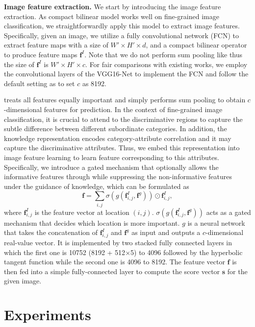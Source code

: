 \documentclass{article}
\begin{document}
\noindent\textbf{Image feature extraction. }We start by introducing the image feature extraction. As compact bilinear model \cite{gao2016compact} works well on fine-grained image classification, we straightforwardly apply this model to extract image features. Specifically, given an image, we utilize a fully convolutional network (FCN) to extract feature maps with a size of $W'\times H' \times d$, and a compact bilinear operator to produce feature maps $\textbf{f}^I$. Note that we do not perform sum pooling like \cite{gao2016compact} thus the size of $\textbf{f}^I$ is $W'\times H' \times c$. For fair comparisons with existing works, we employ the convolutional layers of the VGG16-Net to implement the FCN and follow the default setting as \cite{gao2016compact} to set $c$ as 8192.

\cite{gao2016compact} treats all features equally important and simply performs sum pooling to obtain $c$-dimensional features for prediction. In the context of fine-grained image classification, it is crucial to attend to the discriminative regions to capture the subtle difference between different subordinate categories. In addition, the knowledge representation encodes category-attribute correlation and it may capture the discriminative attributes. Thus, we embed this representation into image feature learning to learn feature corresponding to this attributes. Specifically, we introduce a gated mechanism that optionally allows the informative features through while suppressing the non-informative features under the guidance of knowledge, which can be formulated as
\begin{equation}
    \mathbf{f}=\sum_{i,j}\sigma\left(g\left(\mathbf{f}_{i,j}^I, \mathbf{f}^g\right)\right)\odot \mathbf{f}_{i,j}^I,
\end{equation}
where $\mathbf{f}_{i,j}^I$ is the feature vector at location $(i,j)$. $\sigma\left(g\left(\mathbf{f}_{i,j}^I, \mathbf{f}^g\right)\right)$ acts as a gated mechanism that decides which location is more important. $g$ is a neural network that takes the concatenation of $\mathbf{f}_{i,j}^I$ and $\mathbf{f}^g$ as input and outputs a $c$-dimensional real-value vector. It is implemented by two stacked fully connected layers in which the first one is 10752 (8192 + 512$\times$5) to 4096 followed by the hyperbolic tangent function while the second one is 4096 to 8192. The feature vector $\mathbf{f}$ is then fed into a simple fully-connected layer to compute the score vector $\mathbf{s}$ for the given image. 

\section{Experiments}
\end{document}
